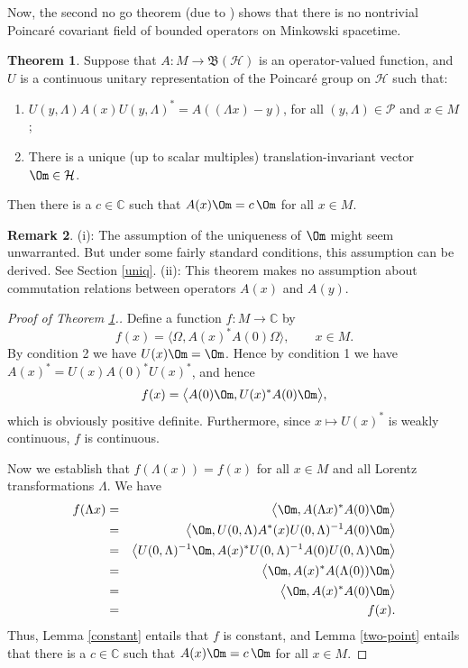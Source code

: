 \documentclass[11pt]{article}
\newcommand{\bh}{\mathfrak{B}(\mathcal{H})}
\theoremstyle{definition}
\newtheorem{thm}{Theorem}[section]
\theoremstyle{definition}
\newtheorem{note}[thm]{Remark}
\theoremstyle{remark}
\def\2#1{{\mathcal #1}}
\def\7#1{{\mathbb #1}}
\begin{document}
Now, the second no go theorem (due to \cite{wizi}) shows that there is no nontrivial
Poincar{\'e} covariant field of bounded operators on Minkowski spacetime.  

\begin{thm} Suppose that $A:M\to \bh$ is an operator-valued function, and $U$ is a
  continuous unitary representation of the Poincar{\'e} group on $\2H$ such that:
\begin{enumerate}
\item $U(y,\Lambda )A(x)U(y,\Lambda )^*=A((\Lambda x)-y)$, for all $(y,\Lambda )\in
  \2P$ and $x\in M$;
\item There is a unique (up to scalar multiples) translation-invariant vector $\Om
  \in \2H$.
\end{enumerate} Then there is a $c\in \7C$ such that $A(x)\Om =c\,\Om$ for all $x\in
M$.
\label{kami}
\end{thm}

\begin{note} (i): The assumption of the uniqueness of
  $\Om$ might seem unwarranted.  But under some fairly
  standard conditions, this assumption can be derived.
  See Section \ref{uniq}.  (ii): This theorem makes no
  assumption about commutation relations between
  operators $A(x)$ and $A(y)$.  \end{note}

\begin{proof}[Proof of Theorem \ref{kami}.] Define a function $f:M\to \7C$ by
  $$ f(x)= \bigl\langle \Omega ,A(x)^*A(0)\Omega \big\rangle  ,\qquad x\in M .$$
  By condition 2 we have $U(x)\Om =\Om$.  Hence by condition 1 we have
  $A(x)^*=U(x)A(0)^*U(x)^*$, and hence
$$ f(x) =\bigl\langle A(0)\Om ,U(x)^*A(0)\Om \bigr\rangle  , $$
which is obviously positive definite.  Furthermore, since $x\mapsto U(x)^*$ is weakly
continuous, $f$ is continuous.

Now we establish that $f(\Lambda (x))=f(x)$ for all $x\in M$ and all Lorentz
transformations $\Lambda$.  We have 
\begin{eqnarray*} 
  f(\Lambda x) &=& \bigl\langle \Om ,A(\Lambda x)^*A(0)\Om \bigr\rangle  \\
  &=& \bigl\langle \Om ,U(0,\Lambda )A^*(x)U(0,\Lambda )^{-1}A(0)\Om \bigr\rangle \\
  &=& \bigl\langle U(0,\Lambda )^{-1}\Om ,A(x)^*U(0,\Lambda )^{-1}A(0)U(0,\Lambda )\Om
  \bigr\rangle \\
  &=& \bigl\langle \Om ,A(x)^*A(\Lambda (0))\Om \bigr\rangle \\
  &=& \bigl\langle \Om ,A(x)^*A(0)\Om \bigr\rangle \\
  &=& f(x) .
\end{eqnarray*}
Thus, Lemma \ref{constant} entails that $f$ is constant, and Lemma \ref{two-point}
entails that there is a $c\in \7C$ such that $A(x)\Om =c\,\Om$ for all $x\in M$. 
\end{proof}
\end{document}
